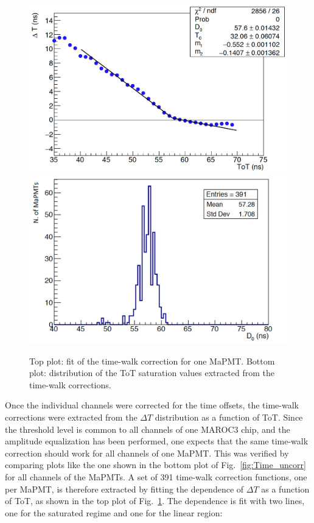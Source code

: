 \documentclass[5p,times,twocolumn]{elsarticle}
\begin{document}
\begin{figure}[t]
\begin{center}
\includegraphics[width=1.0\columnwidth]{time_walk_fit2.png}
\includegraphics[width=0.98\columnwidth]{Saturation_ToT4.png}
\end{center}
\caption{Top plot: fit of the time-walk correction for one MaPMT. Bottom plot: distribution of the ToT saturation
  values extracted from the time-walk corrections.}
\label{Fig:TimeWalk}
\end{figure}

Once the individual channels were corrected for the time offsets, the time-walk corrections were extracted from
the $\Delta T$ distribution as a function of ToT. Since the threshold level is common to all channels of one MAROC3
chip, and the amplitude equalization has been performed, one expects that the same time-walk correction should work
for all channels of one MaPMT. This was verified by comparing plots like the one shown in the bottom plot of
Fig.~\ref{fig:Time_uncorr} for all channels of the MaPMTs. A set of 391 time-walk correction functions, one
per MaPMT, is therefore extracted by fitting the dependence of $\Delta T$ as a function of ToT, as shown in the
top plot of Fig.~\ref{Fig:TimeWalk}. The dependence is fit with two lines, one for the saturated regime and
one for the linear region: 
\end{document}
